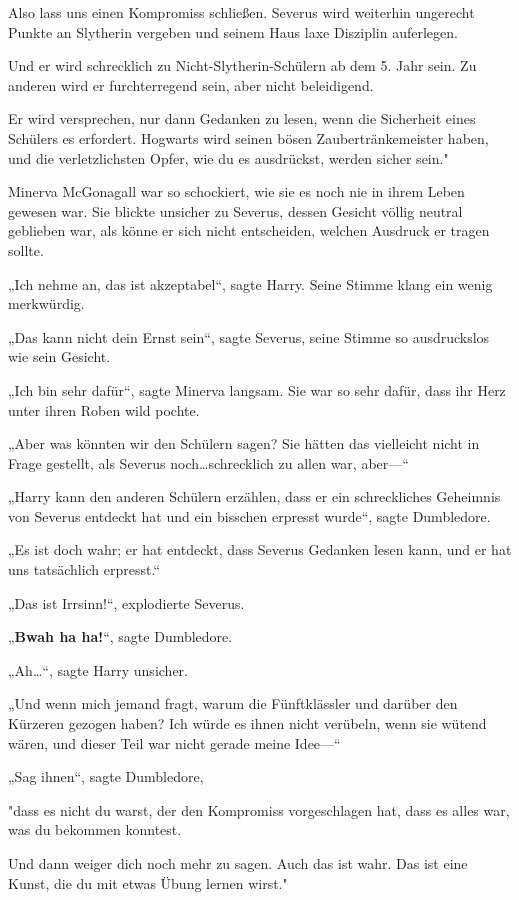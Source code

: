 {Also lass uns einen Kompromiss schließen. Severus wird weiterhin ungerecht Punkte an Slytherin vergeben und seinem Haus laxe Disziplin auferlegen.

Und er wird schrecklich zu Nicht-Slytherin-Schülern ab dem 5. Jahr sein. Zu anderen wird er furchterregend sein, aber nicht beleidigend.

Er wird versprechen, nur dann Gedanken zu lesen, wenn die Sicherheit eines Schülers es erfordert. Hogwarts wird seinen bösen Zaubertränkemeister haben, und die verletzlichsten Opfer, wie du es ausdrückst, werden sicher sein."

Minerva McGonagall war so schockiert, wie sie es noch nie in ihrem Leben gewesen war. Sie blickte unsicher zu Severus, dessen Gesicht völlig neutral geblieben war, als könne er sich nicht entscheiden, welchen Ausdruck er tragen sollte.

„Ich nehme an, das ist akzeptabel“, sagte Harry. Seine Stimme klang ein wenig merkwürdig.

„Das kann nicht dein Ernst sein“, sagte Severus, seine Stimme so ausdruckslos wie sein Gesicht.

„Ich bin sehr dafür“, sagte Minerva langsam. Sie war so sehr dafür, dass ihr Herz unter ihren Roben wild pochte.

„Aber was könnten wir den Schülern sagen? Sie hätten das vielleicht nicht in Frage gestellt, als Severus noch…schrecklich zu allen war, aber—“

„Harry kann den anderen Schülern erzählen, dass er ein schreckliches Geheimnis von Severus entdeckt hat und ein bisschen erpresst wurde“, sagte Dumbledore.

„Es ist doch wahr; er hat entdeckt, dass Severus Gedanken lesen kann, und er hat uns tatsächlich erpresst.“

„Das ist Irrsinn!“, explodierte Severus.

„\textbf{Bwah ha ha!}“, sagte Dumbledore.

„Ah…“, sagte Harry unsicher.

„Und wenn mich jemand fragt, warum die Fünftklässler und darüber den Kürzeren gezogen haben? Ich würde es ihnen nicht verübeln, wenn sie wütend wären, und dieser Teil war nicht gerade meine Idee—“

„Sag ihnen“, sagte Dumbledore,

"dass es nicht du warst, der den Kompromiss vorgeschlagen hat, dass es alles war, was du bekommen konntest.

Und dann weiger dich noch mehr zu sagen. Auch das ist wahr. Das ist eine Kunst, die du mit etwas Übung lernen wirst."

}
